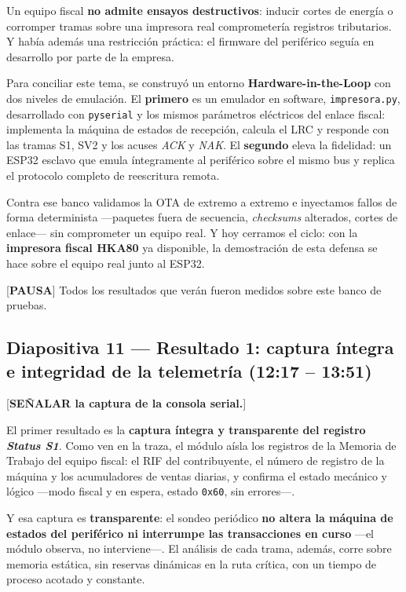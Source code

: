 \documentclass[11pt, a4paper]{article}
\begin{document}
Un equipo fiscal \textbf{no admite ensayos destructivos}: inducir cortes de energía o corromper tramas sobre una impresora real comprometería registros tributarios. Y había además una restricción práctica: el firmware del periférico seguía en desarrollo por parte de la empresa.

Para conciliar este tema, se construyó un entorno \textbf{Hardware-in-the-Loop} con dos niveles de emulación. El \textbf{primero} es un emulador en software, \texttt{impresora.py}, desarrollado con \texttt{pyserial} y los mismos parámetros eléctricos del enlace fiscal: implementa la máquina de estados de recepción, calcula el LRC y responde con las tramas S1, SV2 y los acuses \textit{ACK} y \textit{NAK}. El \textbf{segundo} eleva la fidelidad: un ESP32 esclavo que emula íntegramente al periférico sobre el mismo bus y replica el protocolo completo de reescritura remota.

Contra ese banco validamos la OTA de extremo a extremo e inyectamos fallos de forma determinista —paquetes fuera de secuencia, \textit{checksums} alterados, cortes de enlace— sin comprometer un equipo real. Y hoy cerramos el ciclo: con la \textbf{impresora fiscal HKA80} ya disponible, la demostración de esta defensa se hace sobre el equipo real junto al ESP32.

[\textbf{PAUSA}] Todos los resultados que verán fueron medidos sobre este banco de pruebas.

\subsection*{Diapositiva 11 — Resultado 1: captura íntegra e integridad de la telemetría (12:17 – 13:51)}

[\textbf{SEÑALAR la captura de la consola serial.}]

El primer resultado es la \textbf{captura íntegra y transparente del registro \textit{Status S1}}. Como ven en la traza, el módulo aísla los registros de la Memoria de Trabajo del equipo fiscal: el RIF del contribuyente, el número de registro de la máquina y los acumuladores de ventas diarias, y confirma el estado mecánico y lógico —modo fiscal y en espera, estado \texttt{0x60}, sin errores—.

Y esa captura es \textbf{transparente}: el sondeo periódico \textbf{no altera la máquina de estados del periférico ni interrumpe las transacciones en curso} —el módulo observa, no interviene—. El análisis de cada trama, además, corre sobre memoria estática, sin reservas dinámicas en la ruta crítica, con un tiempo de proceso acotado y constante.
\end{document}
